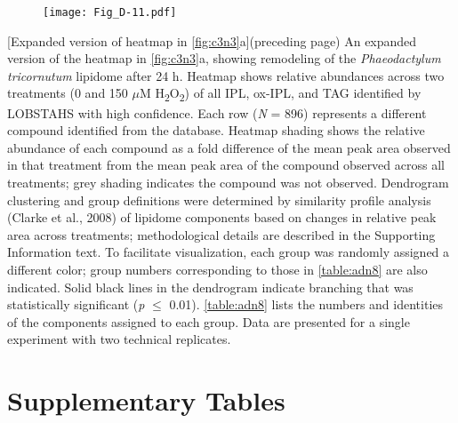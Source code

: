 \begin{figure}[!th]
\centering
\texttt{[image: Fig\_D-11.pdf]}
\end{figure}
[Expanded version of heatmap in \autoref{fig:c3n3}a]{(preceding page) An expanded version of the heatmap in \autoref{fig:c3n3}a, showing remodeling of the \emph{Phaeodactylum tricornutum} lipidome after 24 h. Heatmap shows relative abundances across two treatments (0 and 150 $\mu$M H\textsubscript{2}O\textsubscript{2}) of all IPL, ox-IPL, and TAG identified by LOBSTAHS with high confidence. Each row (\emph{N} = 896) represents a different compound identified from the database. Heatmap shading shows the relative abundance of each compound as a fold difference of the mean peak area observed in that treatment from the mean peak area of the compound observed across all treatments; grey shading indicates the compound was not observed. Dendrogram clustering and group definitions were determined by similarity profile analysis (Clarke et al., 2008) of lipidome components based on changes in relative peak area across treatments; methodological details are described in the Supporting Information text. To facilitate visualization, each group was randomly assigned a different color; group numbers corresponding to those in \autoref{table:adn8} are also indicated. Solid black lines in the dendrogram indicate branching that was statistically significant (\emph{p} $\leq$ 0.01). \autoref{table:adn8} lists the numbers and identities of the components assigned to each group. Data are presented for a single experiment with two technical replicates.}
\label{fig:adn11}

\clearpage


\section{Supplementary Tables}

\clearpage

